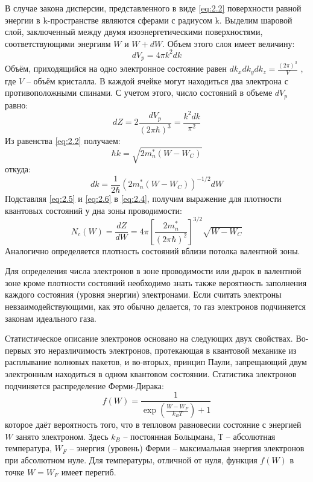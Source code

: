 		В случае закона дисперсии, представленного в виде \eqref{eq:2.2} поверхности равной энергии в k-пространстве являются
		сферами с радиусом k. Выделим шаровой слой, заключенный между двумя изоэнергетическими поверхностями, соответствующими
		энергиям $W$ и $W+dW$. Объем этого слоя имеет величину: 
		\begin{equation}
		dV_p = 4 \pi k^2 d k
		\label{eq:2.3}
		\end{equation}
		Объём, приходящийся на одно электронное состояние равен $dk_x dk_y dk_z = \frac{(2 \pi)^3}{V}$ , где $V$ – объём
		кристалла. В каждой ячейке могут находиться два электрона с противоположными спинами. С учетом этого, число состояний в
		объеме $dV_p$ равно: 
		\begin{equation}
		d Z=2 \frac{d V_{p}}{(2 \pi \hbar)^{3}}=\frac{k^{2} d k}{\pi^{2}}
		\label{eq:2.4}
		\end{equation}
		Из равенства \eqref{eq:2.2} получаем: 
		\begin{equation}
		\hbar k=\sqrt{2 m_{n}^{*}\left(W-W_{C}\right)}
		\label{eq:2.5}
		\end{equation}
		откуда:
		\begin{equation}
		d k=\frac{1}{2 \hbar}\left(2 m_{n}^{*}\left(W-W_{C}\right)\right)^{-1 / 2} d W
		\label{eq:2.6}
		\end{equation}
		Подставляя \eqref{eq:2.5} и \eqref{eq:2.6} в \eqref{eq:2.4}, получим выражение для плотности квантовых состояний у дна зоны
		проводимости:
		\begin{equation}
		N_{c}(W)=\frac{d Z}{d W}=4 \pi\left[\frac{2 m_{n}^{*}}{(2 \pi \hbar)^{2}}\right]^{3 / 2} \sqrt{W-W_{C}}
		\label{eq:2.7}
		\end{equation} 
		Аналогично определяется плотность состояний вблизи потолка валентной зоны.
		
		Для определения числа электронов в зоне проводимости или дырок в валентной зоне кроме плотности состояний необходимо
		знать также вероятность заполнения каждого состояния (уровня энергии) электронами. Если считать электроны
		невзаимодействующими, как это обычно делается, то газ электронов подчиняется законам идеального газа. 
		
		Статистическое описание электронов основано на следующих двух свойствах. Во-первых это неразличимость электронов,
		протекающая в квантовой механике из расплывание волновых пакетов, и во-вторых, принцип Паули, запрещающий двум
		электронным находиться в одном квантовом состоянии. Статистика электронов подчиняется распределение Ферми-Дирака:   
		\begin{equation}
		f(W) = \frac{1}{\exp(\frac{W-W_F}{k_B T})+1}
		\label{eq:2.8}
		\end{equation}
		которое даёт вероятность того, что в тепловом равновесии состояние с энергией $W$ занято электроном. Здесь $k_B$ –
		постоянная Больцмана, $Т$ – абсолютная температура, $W_F$ – энергия (уровень) Ферми – максимальная энергия электронов при
		абсолютном нуле. Для температуры, отличной от нуля, функция $f(W)$ в точке $W = W_F$ имеет перегиб.
		
